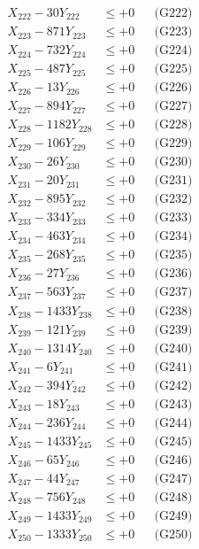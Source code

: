 \documentclass[a4paper,10pt]{article}
\begin{document}
{\begin{align}
X_{222} - 30Y_{222} &\leq +0 && \text{(G222)} \\
X_{223} - 871Y_{223} &\leq +0 && \text{(G223)} \\
X_{224} - 732Y_{224} &\leq +0 && \text{(G224)} \\
X_{225} - 487Y_{225} &\leq +0 && \text{(G225)} \\
X_{226} - 13Y_{226} &\leq +0 && \text{(G226)} \\
X_{227} - 894Y_{227} &\leq +0 && \text{(G227)} \\
X_{228} - 1182Y_{228} &\leq +0 && \text{(G228)} \\
X_{229} - 106Y_{229} &\leq +0 && \text{(G229)} \\
X_{230} - 26Y_{230} &\leq +0 && \text{(G230)} \\
\allowbreak
X_{231} - 20Y_{231} &\leq +0 && \text{(G231)} \\
X_{232} - 895Y_{232} &\leq +0 && \text{(G232)} \\
X_{233} - 334Y_{233} &\leq +0 && \text{(G233)} \\
X_{234} - 463Y_{234} &\leq +0 && \text{(G234)} \\
X_{235} - 268Y_{235} &\leq +0 && \text{(G235)} \\
X_{236} - 27Y_{236} &\leq +0 && \text{(G236)} \\
X_{237} - 563Y_{237} &\leq +0 && \text{(G237)} \\
X_{238} - 1433Y_{238} &\leq +0 && \text{(G238)} \\
X_{239} - 121Y_{239} &\leq +0 && \text{(G239)} \\
X_{240} - 1314Y_{240} &\leq +0 && \text{(G240)} \\
\allowbreak
X_{241} - 6Y_{241} &\leq +0 && \text{(G241)} \\
X_{242} - 394Y_{242} &\leq +0 && \text{(G242)} \\
X_{243} - 18Y_{243} &\leq +0 && \text{(G243)} \\
X_{244} - 236Y_{244} &\leq +0 && \text{(G244)} \\
X_{245} - 1433Y_{245} &\leq +0 && \text{(G245)} \\
X_{246} - 65Y_{246} &\leq +0 && \text{(G246)} \\
X_{247} - 44Y_{247} &\leq +0 && \text{(G247)} \\
X_{248} - 756Y_{248} &\leq +0 && \text{(G248)} \\
X_{249} - 1433Y_{249} &\leq +0 && \text{(G249)} \\
X_{250} - 1333Y_{250} &\leq +0 && \text{(G250)} \\

\end{align}}
\end{document}
